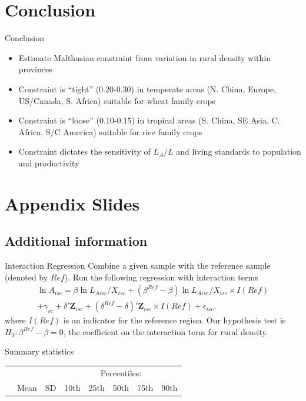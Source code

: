 \documentclass[10pt, xcolor=dvipsnames]{beamer}
\begin{document}
\section{Conclusion}

\begin{frame}{Conclusion}
\begin{itemize}
  \item Estimate Malthusian constraint from variation in rural density within provinces
  \item Constraint is ``tight'' (0.20-0.30) in temperate areas (N. China, Europe, US/Canada, S. Africa) suitable for wheat family crops
  \item Constraint is ``loose'' (0.10-0.15) in tropical areas (S. China, SE Asia, C. Africa, S/C America) suitable for rice family crops
  \item Constraint dictates the sensitivity of $L_A/L$ and living standards to population and productivity
\end{itemize}
\end{frame}

\section{Appendix Slides}
\appendix

\subsection{Additional information}
\begin{frame}{Interaction Regression}\label{interaction}
Combine a given sample with the reference sample (denoted by $Ref$). Run the following regression with interaction terms
\begin{eqnarray}
    \ln A_{isc} = \beta \ln L_{Aisc}/X_{isc} + (\beta^{Ref} - \beta) \ln L_{Aisc}/X_{isc} \times I(Ref) \\ \nonumber
    + \gamma_{sc} + \delta' \mathbf{Z}_{isc} + (\delta^{Ref} - \delta)'\mathbf{Z}_{isc} \times I(Ref) + \epsilon_{isc}. \label{EQ_interaction}
\end{eqnarray}
where $I(Ref)$ is an indicator for the reference region. Our hypothesis test is $H_0: \beta^{Ref} - \beta = 0$, the coefficient on the interaction term for rural density. 

\hfill \hyperlink{testing}{}
\end{frame}

\begin{frame}{Summary statistics}\label{stats}
{\scriptsize
\begin{tabularx}{\textwidth}{lXXXXXXX}
\midrule
 &      &            & \multicolumn{5}{c}{Percentiles:} \\ \cmidrule{4-8}
 & Mean & SD  & 10th    & 25th    & 50th & 75th & 90th \\
\midrule

\midrule
\end{tabularx}
}

\hfill \hyperlink{data}{}
\end{frame}
\end{document}
